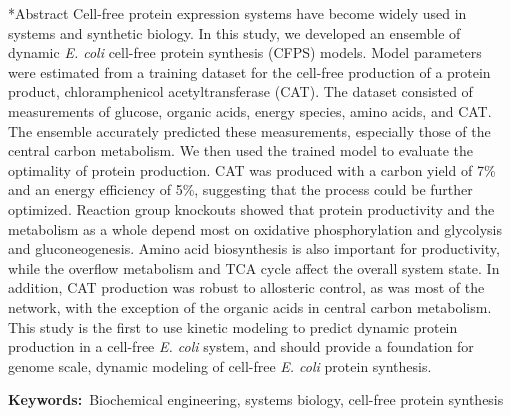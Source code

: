 \documentclass[12pt]{article}
\makeatletter
\renewcommand\section{\@startsection
	{subsection}{2}{0mm}
	{-0.2in}
	{0.05\baselineskip}
	{\normalfont\large\bfseries}}
\makeatother
\begin{document}
\section*{Abstract}
Cell-free protein expression systems have become widely used in systems and synthetic biology.
In this study, we developed an ensemble of dynamic \textit{E. coli} cell-free protein synthesis (CFPS) models.
Model parameters were estimated from a training dataset for the cell-free production of a protein product, chloramphenicol acetyltransferase (CAT).
The dataset consisted of measurements of glucose, organic acids, energy species, amino acids, and CAT.
The ensemble accurately predicted these measurements, especially those of the central carbon metabolism.
We then used the trained model to evaluate the optimality of protein production.
CAT was produced with a carbon yield of 7\% and an energy efficiency of 5\%, suggesting that the process could be further optimized.
Reaction group knockouts showed that protein productivity and the metabolism as a whole depend most on oxidative phosphorylation and glycolysis and gluconeogenesis.
Amino acid biosynthesis is also important for productivity, while the overflow metabolism and TCA cycle affect the overall system state.
In addition, CAT production was robust to allosteric control, as was most of the network, with the exception of the organic acids in central carbon metabolism.
This study is the first to use kinetic modeling to predict dynamic protein production in a cell-free \textit{E. coli} system, and should provide a foundation for genome scale, dynamic modeling of cell-free \textit{E. coli} protein synthesis.

\vspace{0.1in}
{\noindent \textbf{Keywords:}~Biochemical engineering, systems biology, cell-free protein synthesis}

\pagebreak

\setcounter{page}{1}

\end{document}
